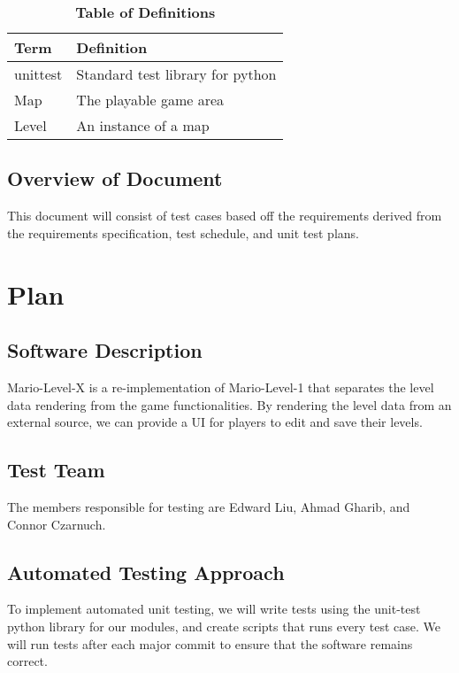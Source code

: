 \documentclass[12pt, titlepage]{article}
\begin{document}
\begin{table}[!htbp]
\caption{\textbf{Table of Definitions}} \label{Table}

\begin{tabularx}{\textwidth}{p{3cm}X}
\toprule
\textbf{Term} & \textbf{Definition}\\
\midrule
unittest & Standard test library for python\\
Map & The playable game area\\
Level & An instance of a map\\

\bottomrule
\end{tabularx}

\end{table}	

\subsection{Overview of Document}
This document will consist of test cases based off the requirements derived from the requirements specification, test schedule, and unit test plans.  

\section{Plan}
	
\subsection{Software Description}
Mario-Level-X is a re-implementation of Mario-Level-1 that separates the level data rendering from the game functionalities. By rendering the level data from an external source, we can provide a UI for players to edit and save their levels.

\subsection{Test Team}
The members responsible for testing are Edward Liu, Ahmad Gharib, and Connor Czarnuch.

\subsection{Automated Testing Approach}
To implement automated unit testing, we will write tests using the unit-test python library for our modules, and create scripts that runs every test case. We will run tests after each major commit to ensure that the software remains correct.
\end{document}
